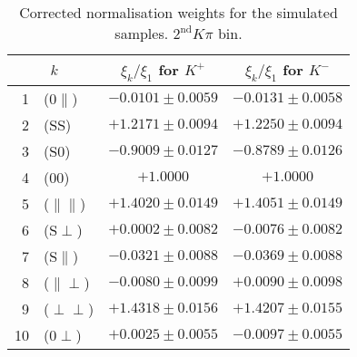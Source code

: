 \begin{table}[hbtp]
\center\footnotesize
  \caption{\small Corrected normalisation weights for the simulated samples. $2^{\text{nd}}K\pi$ bin.}
  \center
  \begin{tabular}{r l c c}
    
    \multicolumn{2}{c}{$k$}       & $\xi_k/\xi_1$ for $K^+$    &  $\xi_k/\xi_1$ for $K^-$        \\
    \hline
     1  &  ($0\parallel$)         & $ -0.0101 \pm 0.0059 $ & $ -0.0131 \pm 0.0058 $     \\
     2  &  (SS)                   & $ +1.2171 \pm 0.0094 $ & $ +1.2250 \pm 0.0094 $     \\
     3  &  (S0)                   & $ -0.9009 \pm 0.0127 $ & $ -0.8789 \pm 0.0126 $     \\
     4  &  (00)                   & $ +1.0000            $ & $ +1.0000            $     \\
     5  &  ($\parallel\parallel$) & $ +1.4020 \pm 0.0149 $ & $ +1.4051 \pm 0.0149 $     \\
     6  &  (S$\perp$)             & $ +0.0002 \pm 0.0082 $ & $ -0.0076 \pm 0.0082 $     \\
     7  &  (S$\parallel$)         & $ -0.0321 \pm 0.0088 $ & $ -0.0369 \pm 0.0088 $     \\
     8  &  ($\parallel\perp$)     & $ -0.0080 \pm 0.0099 $ & $ +0.0090 \pm 0.0098 $     \\
     9  &  ($\perp\perp$)         & $ +1.4318 \pm 0.0156 $ & $ +1.4207 \pm 0.0155 $     \\
    10  &  ($0\perp$)             & $ +0.0025 \pm 0.0055 $ & $ -0.0097 \pm 0.0055 $     \\
    \hline                                                   
  \end{tabular}
\end{table}


